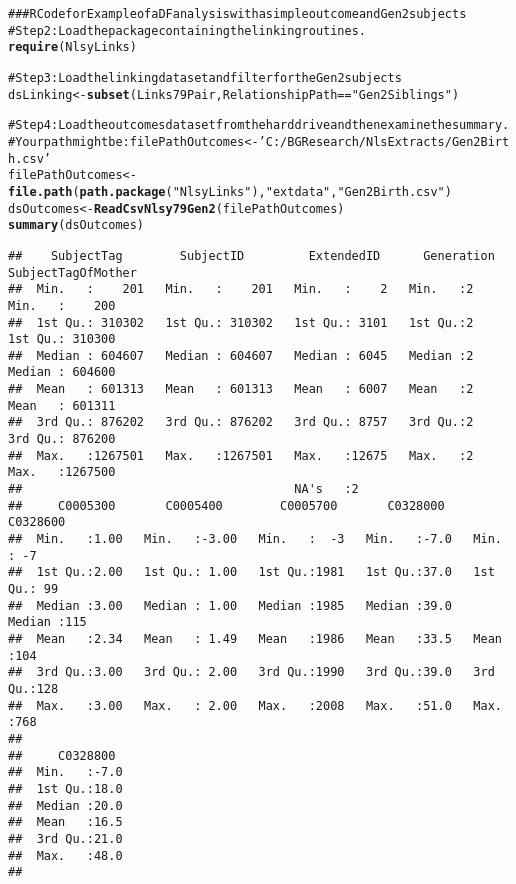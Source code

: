 \documentclass[letterpaper]{article}\usepackage{graphicx, color}
\makeatletter
\newcommand{\hlfunctioncall}[1]{\textcolor[rgb]{0.501960784313725,0,0.329411764705882}{\textbf{#1}}}%
\newcommand{\hlstring}[1]{\textcolor[rgb]{0.6,0.6,1}{#1}}%
\newcommand{\hlcomment}[1]{\textcolor[rgb]{0.180392156862745,0.6,0.341176470588235}{#1}}%
\newenvironment{kframe}{%
 \def\at@end@of@kframe{}%
 \ifinner\ifhmode%
  \def\at@end@of@kframe{\end{minipage}}%
  \begin{minipage}{\columnwidth}%
 \fi\fi%
 \def\FrameCommand##1{\hskip\@totalleftmargin \hskip-\fboxsep
 \colorbox{shadecolor}{##1}\hskip-\fboxsep
     \hskip-\linewidth \hskip-\@totalleftmargin \hskip\columnwidth}%
 \MakeFramed {\advance\hsize-\width
   \@totalleftmargin\z@ \linewidth\hsize
   \@setminipage}}%
 {\par\unskip\endMakeFramed%
 \at@end@of@kframe}
\newenvironment{knitrout}{}{} %
\makeatother
\begin{document}
\begin{knitrout}
\color{fgcolor}\begin{kframe}
\begin{alltt}
\hlcomment{### R Code for Example of a DF analysis with a simple outcome and Gen2 subjects}
\hlcomment{#Step 2: Load the package containing the linking routines.}
\hlfunctioncall{require}(NlsyLinks) 

\hlcomment{#Step 3: Load the linking dataset and filter for the Gen2 subjects}
dsLinking <- \hlfunctioncall{subset}(Links79Pair, RelationshipPath==\hlstring{"Gen2Siblings"})

\hlcomment{#Step 4: Load the outcomes dataset from the hard drive and then examine the summary.}
\hlcomment{#   Your path might be: filePathOutcomes <- 'C:/BGResearch/NlsExtracts/Gen2Birth.csv'}
filePathOutcomes <- \hlfunctioncall{file.path}(\hlfunctioncall{path.package}(\hlstring{"NlsyLinks"}), \hlstring{"extdata"}, \hlstring{"Gen2Birth.csv"})
dsOutcomes <- \hlfunctioncall{ReadCsvNlsy79Gen2}(filePathOutcomes)
\hlfunctioncall{summary}(dsOutcomes)
\end{alltt}
\begin{verbatim}
##    SubjectTag        SubjectID         ExtendedID      Generation SubjectTagOfMother
##  Min.   :    201   Min.   :    201   Min.   :    2   Min.   :2    Min.   :    200   
##  1st Qu.: 310302   1st Qu.: 310302   1st Qu.: 3101   1st Qu.:2    1st Qu.: 310300   
##  Median : 604607   Median : 604607   Median : 6045   Median :2    Median : 604600   
##  Mean   : 601313   Mean   : 601313   Mean   : 6007   Mean   :2    Mean   : 601311   
##  3rd Qu.: 876202   3rd Qu.: 876202   3rd Qu.: 8757   3rd Qu.:2    3rd Qu.: 876200   
##  Max.   :1267501   Max.   :1267501   Max.   :12675   Max.   :2    Max.   :1267500   
##                                      NA's   :2                                      
##     C0005300       C0005400        C0005700       C0328000       C0328600  
##  Min.   :1.00   Min.   :-3.00   Min.   :  -3   Min.   :-7.0   Min.   : -7  
##  1st Qu.:2.00   1st Qu.: 1.00   1st Qu.:1981   1st Qu.:37.0   1st Qu.: 99  
##  Median :3.00   Median : 1.00   Median :1985   Median :39.0   Median :115  
##  Mean   :2.34   Mean   : 1.49   Mean   :1986   Mean   :33.5   Mean   :104  
##  3rd Qu.:3.00   3rd Qu.: 2.00   3rd Qu.:1990   3rd Qu.:39.0   3rd Qu.:128  
##  Max.   :3.00   Max.   : 2.00   Max.   :2008   Max.   :51.0   Max.   :768  
##                                                                            
##     C0328800   
##  Min.   :-7.0  
##  1st Qu.:18.0  
##  Median :20.0  
##  Mean   :16.5  
##  3rd Qu.:21.0  
##  Max.   :48.0  
## 
\end{verbatim}
\begin{alltt}


\end{alltt}
\end{kframe}
\end{knitrout}
\end{document}
